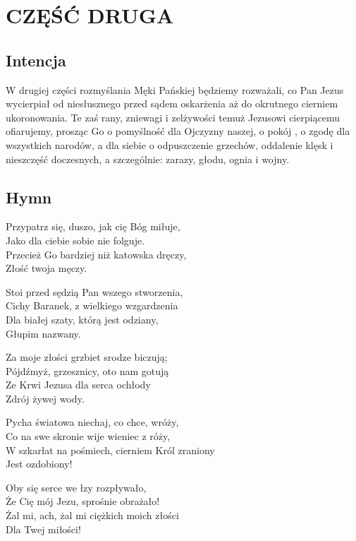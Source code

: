 \section{CZĘŚĆ DRUGA}



\subsection{Intencja}

W drugiej części rozmyślania Męki Pańskiej będziemy rozważali, co Pan
Jezus wycierpiał od niesłusznego przed sądem oskarżenia aż do okrutnego
cierniem ukoronowania. Te zaś rany, zniewagi i zelżywości temuż Jezusowi
cierpiącemu ofiarujemy, prosząc Go o pomyślność dla Ojczyzny naszej, o
pokój , o zgodę dla wszystkich narodów, a dla siebie o odpuszczenie
grzechów, oddalenie klęsk i nieszczęść doczesnych, a szczególnie:
zarazy, głodu, ognia i wojny.


\subsection{Hymn}

Przypatrz się, duszo, jak cię Bóg miłuje,\\
Jako dla ciebie sobie nie folguje.\\
Przecież Go bardziej niż katowska dręczy,\\
Złość twoja męczy.

Stoi przed sędzią Pan wszego stworzenia,\\
Cichy Baranek, z wielkiego wzgardzenia\\
Dla białej szaty, którą jest odziany,\\
Głupim nazwany.

Za moje złości grzbiet srodze biczują;\\
Pójdźmyż, grzesznicy, oto nam gotują\\
Ze Krwi Jezusa dla serca ochłody\\
Zdrój żywej wody.

Pycha światowa niechaj, co chce, wróży,\\
Co na swe skronie wije wieniec z róży,\\
W szkarłat na pośmiech, cierniem Król zraniony\\
Jest ozdobiony!

Oby się serce we łzy rozpływało,\\
Że Cię mój Jezu, sprośnie obrażało!\\
Żal mi, ach, żal mi ciężkich moich złości\\
Dla Twej miłości!


